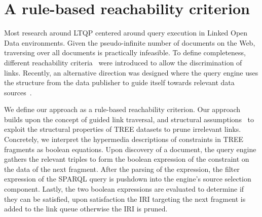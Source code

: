 \section{A rule-based reachability criterion}



Most research around LTQP centered around query execution in Linked Open Data environments.
Given the pseudo-infinite number of documents on the Web, traversing over all documents is practically infeasible.
To define completeness, different reachability criteria~\cite{hartig2012} were introduced to allow the discrimination of links.
Recently, an alternative direction was designed where the query engine uses the structure from the data publisher to guide itself towards relevant data sources~\cite{taelman2023, verborgh2020}.

We define our approach as a rule-based reachability criterion.
Our approach builds upon the concept of guided link traversal, and structural assumptions~\cite{taelman2023} to exploit the structural properties of TREE datasets to prune irrelevant links.
Concretely, we interpret the hypermedia descriptions of constraints in TREE fragments as boolean equations.
Upon discovery of a document, the query engine gathers the relevant triples to form the boolean expression of the constraint on the data of the next fragment.
After the parsing of the expression, the filter expression of the SPARQL query is pushdown into the engine's source selection component.
Lastly, the two boolean expressions are evaluated to determine if they can be satisfied, upon satisfaction the IRI targeting the next fragment is added to the link queue otherwise the IRI is pruned.


